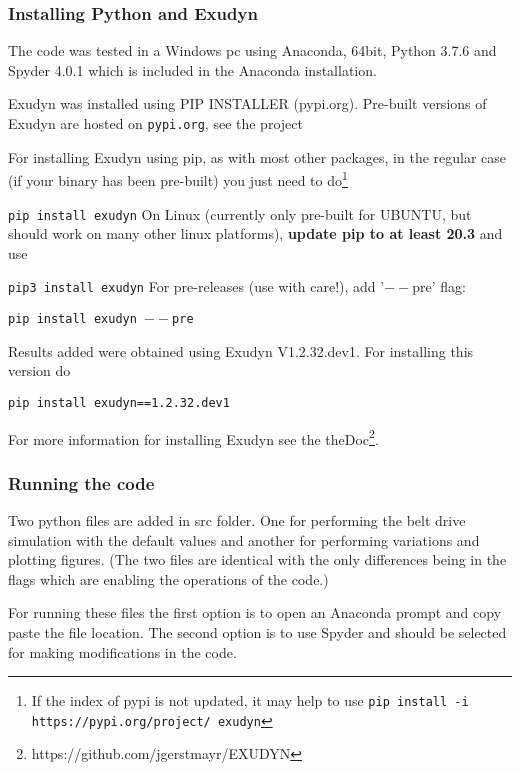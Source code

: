 \subsubsection{Installing Python and Exudyn}
The code was tested in a Windows pc using Anaconda, 64bit, Python 3.7.6 and Spyder 4.0.1 which is included in the Anaconda installation.

Exudyn was installed using PIP INSTALLER (pypi.org).
Pre-built versions of Exudyn are hosted on \texttt{pypi.org}, see the project
\bi
 \item {}
\ei
For installing Exudyn using pip, as with most other packages, in the regular case (if your binary has been pre-built) you just need to do\footnote{If the index of pypi is not updated, it may help to use \texttt{pip install -i https://pypi.org/project/ exudyn} }
\bi
  \item[] \texttt{pip install exudyn}
\ei
On Linux (currently only pre-built for UBUNTU, but should work on many other linux platforms), {\bf update pip to at least 20.3} and use 
\bi
  \item[] \texttt{pip3 install exudyn}
\ei
For pre-releases (use with care!), add '$--$pre' flag:
\bi
  \item[] \texttt{pip install exudyn $--$pre}
\ei  
  
Results added  
were obtained using Exudyn V1.2.32.dev1. For installing this version do
\bi
  \item[] \texttt{pip install exudyn==1.2.32.dev1}
\ei
             
For more information for installing Exudyn see the theDoc\footnote{https://github.com/jgerstmayr/EXUDYN}.
\subsubsection{Running the code}
Two python files are added in src folder. One for performing the belt drive simulation with the default values and another for performing variations and plotting figures. (The two files are identical with the only differences being in the flags which are enabling the operations of the code.)
 
For running these files the first option is to open an Anaconda prompt and copy paste the file location.
The second option is to use Spyder and should be selected for making modifications in the code. 
